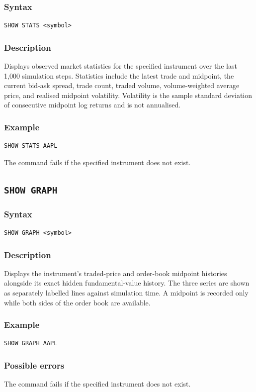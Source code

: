 \documentclass{article}
\begin{document}
\subsubsection*{Syntax}

\begin{lstlisting}
SHOW STATS <symbol>
\end{lstlisting}

\subsubsection*{Description}

Displays observed market statistics for the specified instrument over the
last 1,000 simulation steps. Statistics include the latest trade and midpoint,
the current bid-ask spread, trade count, traded volume, volume-weighted average
price, and realised midpoint volatility. Volatility is the sample standard
deviation of consecutive midpoint log returns and is not annualised.

\subsubsection*{Example}

\begin{lstlisting}
SHOW STATS AAPL
\end{lstlisting}

The command fails if the specified instrument does not exist.

\subsection{\texttt{SHOW GRAPH}}

\subsubsection*{Syntax}

\begin{lstlisting}
SHOW GRAPH <symbol>
\end{lstlisting}

\subsubsection*{Description}

Displays the instrument's traded-price and order-book midpoint histories
alongside its exact hidden fundamental-value history. The three series are
shown as separately labelled lines against simulation time. A midpoint is
recorded only while both sides of the order book are available.

\subsubsection*{Example}

\begin{lstlisting}
SHOW GRAPH AAPL
\end{lstlisting}

\subsubsection*{Possible errors}

The command fails if the specified instrument does not exist.
\end{document}
